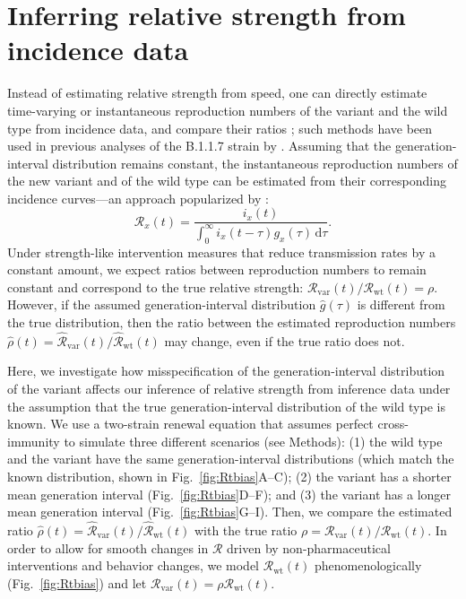 \documentclass[12pt]{article}
\newcommand{\fref}[1]{Fig.~\ref{fig:#1}}
\newcommand{\vvvar}{\mathrm{var}}
\newcommand{\wwwt}{\mathrm{wt}}
\newcommand{\Rx}[1]{\ensuremath{{\mathcal R}_{#1}}\xspace}
\newcommand{\RR}{\ensuremath{{\mathcal R}}\xspace}
\newcommand{\Rw}{\Rx{\wwwt}}
\newcommand{\Rv}{\Rx{\vvvar}}
\newcommand{\dd}[1]{\ensuremath{\, \mathrm{d}#1}}
\newcommand{\dtau}{\dd{\tau}}
\begin{document}
\section{Inferring relative strength from incidence data}

Instead of estimating relative strength from speed, one can directly estimate time-varying or instantaneous reproduction numbers of the variant and the wild type from incidence data, and compare their ratios \citep{fraser2007estimating};
such methods have been used in previous analyses of the B.1.1.7 strain by \cite{volz2021transmission}.
Assuming that the generation-interval distribution remains constant, the instantaneous reproduction numbers of the new variant and of the wild type can be estimated from their corresponding incidence curves---an approach popularized by \cite{cori2013new}:
\begin{equation}
\RR_x(t) = \frac{i_x(t)}{\int_0^\infty i_x(t-\tau) g_x(\tau) \dtau}.
\end{equation}
Under strength-like intervention measures that reduce transmission rates by a constant amount, we expect ratios between reproduction numbers to remain constant and correspond to the true relative strength: $\Rv(t)/\Rw(t) = \rho$.
However, if the assumed generation-interval distribution $\hat{g}(\tau)$ is different from the true distribution, then the ratio between the estimated reproduction numbers $\hat{\rho}(t) = \hat{\RR}_{\textrm{var}}(t)/\hat{\RR}_{\textrm{wt}}(t)$ may change, even if the true ratio does not.

Here, we investigate how misspecification of the generation-interval distribution of the variant affects our inference of relative strength from inference data under the assumption that the true generation-interval distribution of the wild type is known.
We use a two-strain renewal equation that assumes perfect cross-immunity to simulate three different scenarios (see Methods):  
(1) the wild type and the variant have the same generation-interval distributions (which match the known distribution, shown in \fref{Rtbias}A--C);
(2) the variant has a shorter mean generation interval (\fref{Rtbias}D--F); and
(3) the variant has a longer mean generation interval (\fref{Rtbias}G--I).
Then, we compare the estimated ratio $\hat{\rho}(t) = \hat{\RR}_{\textrm{var}}(t)/\hat{\RR}_{\textrm{wt}}(t)$ with the true ratio $\rho = \Rv(t)/\Rw(t)$.
In order to allow for smooth changes in $\RR$ driven by non-pharmaceutical interventions and behavior changes, we model $\Rw(t)$ phenomenologically (\fref{Rtbias}) and let $\Rv(t) = \rho \Rw(t)$.
\end{document}
